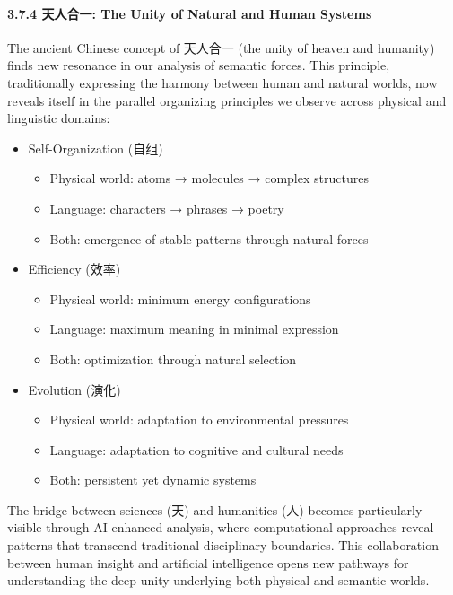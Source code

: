 \documentclass[
  11pt,
  letterpaper,
]{article}
\providecommand{\tightlist}{%
  \setlength{\itemsep}{0pt}\setlength{\parskip}{0pt}}
\begin{document}
\hypertarget{ux5929ux4ebaux5408ux4e00-the-unity-of-natural-and-human-systems}{%
\paragraph{3.7.4 天人合一: The Unity of Natural and Human
Systems}\label{ux5929ux4ebaux5408ux4e00-the-unity-of-natural-and-human-systems}}

The ancient Chinese concept of 天人合一 (the unity of heaven and
humanity) finds new resonance in our analysis of semantic forces. This
principle, traditionally expressing the harmony between human and
natural worlds, now reveals itself in the parallel organizing principles
we observe across physical and linguistic domains:

\begin{itemize}
\tightlist
\item
  Self-Organization (自组)

  \begin{itemize}
  \tightlist
  \item
    Physical world: atoms → molecules → complex structures
  \item
    Language: characters → phrases → poetry
  \item
    Both: emergence of stable patterns through natural forces
  \end{itemize}
\item
  Efficiency (效率)

  \begin{itemize}
  \tightlist
  \item
    Physical world: minimum energy configurations
  \item
    Language: maximum meaning in minimal expression
  \item
    Both: optimization through natural selection
  \end{itemize}
\item
  Evolution (演化)

  \begin{itemize}
  \tightlist
  \item
    Physical world: adaptation to environmental pressures
  \item
    Language: adaptation to cognitive and cultural needs
  \item
    Both: persistent yet dynamic systems
  \end{itemize}
\end{itemize}

The bridge between sciences (天) and humanities (人) becomes
particularly visible through AI-enhanced analysis, where computational
approaches reveal patterns that transcend traditional disciplinary
boundaries. This collaboration between human insight and artificial
intelligence opens new pathways for understanding the deep unity
underlying both physical and semantic worlds.
\end{document}
